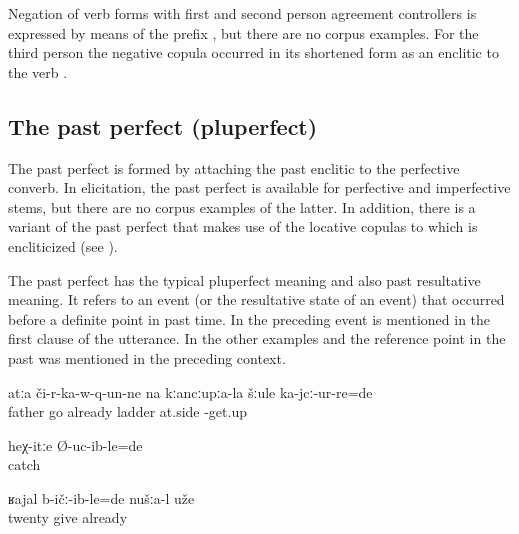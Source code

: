 Negation of verb forms with first and second person agreement controllers is expressed by means of the prefix , but there are no corpus examples. For the third person the negative copula  occurred in its shortened form as an enclitic to the verb . 



\subsection{The past perfect (pluperfect)}
\label{ssec:The past perfect (pluperfect)}

The past perfect is formed by attaching the past enclitic  to the perfective converb. In elicitation, the past perfect is available for perfective and imperfective stems, but there are no corpus examples of the latter. In addition, there is a variant of the past perfect that makes use of the locative copulas to which  is encliticized (see ). 

The past perfect has the typical pluperfect meaning and also past resultative meaning. It refers to an event (or the resultative state of an event) that occurred before a definite point in past time. In  the preceding event is mentioned in the first clause of the utterance. In the other examples  and  the reference point in the past was mentioned in the preceding context.
%
\begin{exe}
	\ex	\label{ex:‎‎The father came down and stood next to the ladder analytic}
	\gll	atːa	či-r-ka-w-q-un-ne	na	kːancːupːa-la	šːule	ka-jcː-ur-re=de\\
		father	go	already	ladder	at.side	-get.up\\
	\glt	{}

	\ex	\label{ex:Like this (he) had caught (me) analytic}
	\gll	heχ-itːe	Ø-uc-ib-le=de\\
			catch\\
	\glt	{}

	\ex	\label{ex:‎‎‎We had already given twenty analytic}
	\gll	ʁajal	b-ičː-ib-le=de	nušːa-l	uže\\
		twenty	give		already\\
	\glt	{}
\end{exe}

